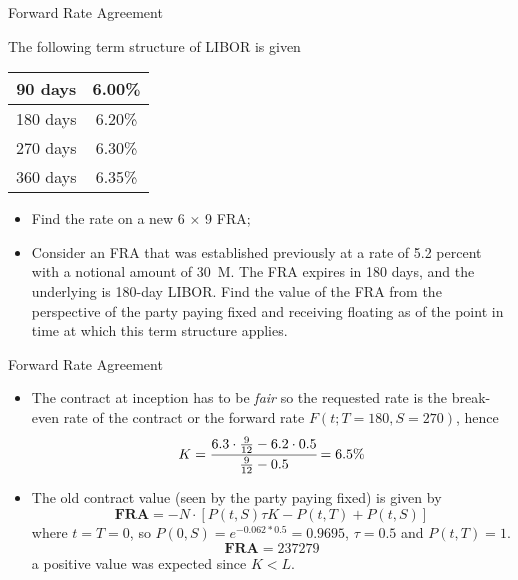 \documentclass{beamer}
\begin{document}
\begin{frame}{Forward Rate Agreement}
\begin{block}{}
The following term structure of LIBOR is given 
\begin{table}[htbp]
\begin{center}
\begin{tabular}{c|c}
90 days & 6.00\% \\ \hline
180 days & 6.20\% \\ \hline
270 days & 6.30\% \\ \hline
360 days & 6.35\% \\
\end{tabular}
\end{center}
\end{table}
\begin{itemize}
\item Find the rate on a new 6 × 9 FRA;
\item Consider an FRA that was established previously at a rate of 5.2 percent with a notional amount of 30~M. The FRA expires in 180 days, and the underlying is 180-day LIBOR. Find the value of the FRA from the perspective of the party paying fixed and receiving floating as of the point in time at which this term structure applies.
\end{itemize}
\end{block}
\end{frame}

\begin{frame}{Forward Rate Agreement}
\begin{itemize}
\item The contract at inception has to be \emph{fair} so the requested rate is the break-even rate of the contract or the forward rate $F(t; T=180, S=270)$, hence
\begin{equation*}
K = \cfrac{6.3\cdot\frac{9}{12}-6.2\cdot0.5}{\frac{9}{12}-0.5} = 6.5\%
\end{equation*}
\item The old contract value (seen by the party paying fixed) is given by 
\begin{equation*}
\textbf{FRA} = -N\cdot[P(t,S)\tau K - P(t,T) + P(t, S)]
\end{equation*}
where $t=T=0$, so $P(0,S)=e^{-0.062*0.5}= 0.9695$, $\tau=0.5$ and $P(t,T)=1$.
\begin{equation*}
\textbf{FRA} = 237279
\end{equation*}
a positive value was expected since $K<L$.
\end{itemize}
\end{frame}
\end{document}

